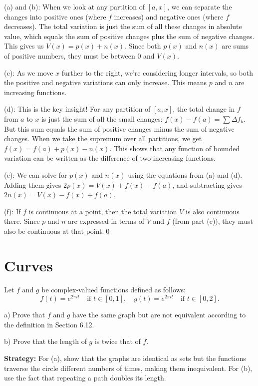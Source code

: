 (a) and (b): When we look at any partition of $[a,x]$, we can separate the changes into positive ones (where $f$ increases) and negative ones (where $f$ decreases). The total variation is just the sum of all these changes in absolute value, which equals the sum of positive changes plus the sum of negative changes. This gives us $V(x) = p(x) + n(x)$. Since both $p(x)$ and $n(x)$ are sums of positive numbers, they must be between $0$ and $V(x)$.

(c): As we move $x$ further to the right, we're considering longer intervals, so both the positive and negative variations can only increase. This means $p$ and $n$ are increasing functions.

(d): This is the key insight! For any partition of $[a,x]$, the total change in $f$ from $a$ to $x$ is just the sum of all the small changes: $f(x) - f(a) = \sum \Delta f_k$. But this sum equals the sum of positive changes minus the sum of negative changes. When we take the supremum over all partitions, we get $f(x) = f(a) + p(x) - n(x)$. This shows that any function of bounded variation can be written as the difference of two increasing functions.

(e): We can solve for $p(x)$ and $n(x)$ using the equations from (a) and (d). Adding them gives $2p(x) = V(x) + f(x) - f(a)$, and subtracting gives $2n(x) = V(x) - f(x) + f(a)$.

(f): If $f$ is continuous at a point, then the total variation $V$ is also continuous there. Since $p$ and $n$ are expressed in terms of $V$ and $f$ (from part (e)), they must also be continuous at that point.\qed
\section{Curves}



\begin{problembox}
Let $f$ and $g$ be complex-valued functions defined as follows:
\[f(t) = e^{2\pi it} \quad \text{if } t \in [0, 1], \quad g(t) = e^{2\pi it} \quad \text{if } t \in [0, 2].\]

a) Prove that $f$ and $g$ have the same graph but are not equivalent according to the definition in Section 6.12.

b) Prove that the length of $g$ is twice that of $f$.
\end{problembox}

\noindent\textbf{Strategy:} For (a), show that the graphs are identical as sets but the functions traverse the circle different numbers of times, making them inequivalent. For (b), use the fact that repeating a path doubles its length.

